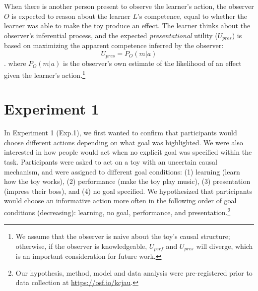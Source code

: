 \documentclass[10pt, letterpaper]{article}
\begin{document}
When there is another person present to observe the learner's action,
the observer \(O\) is expected to reason about the learner \(L\)'s
competence, equal to whether the learner was able to make the toy
produce an effect. The learner thinks about the observer's inferential
process, and the expected \emph{presentational} utility (\(U_{pres}\))
is based on maximizing the apparent competence inferred by the observer:
\[ U_{pres} = P_O(m | a)\]. \noindent
where \(P_O(m | a)\) is the observer's own estimate of the likelihood of
an effect given the learner's action.\footnote{We assume that the
  observer is naive about the toy's causal structure; otherwise, if the
  observer is knowledgeable, \(U_{perf}\) and \(U_{pres}\) will diverge,
  which is an important consideration for future work.}

\section{Experiment 1}\label{experiment-1}

In Experiment 1 (Exp.1), we first wanted to confirm that participants
would choose different actions depending on what goal was highlighted.
We were also interested in how people would act when no explicit goal
was specified within the task. Participants were asked to act on a toy
with an uncertain causal mechanism, and were assigned to different goal
conditions: (1) learning (learn how the toy works), (2) performance
(make the toy play music), (3) presentation (impress their boss), and
(4) no goal specified. We hypothesized that participants would choose an
informative action more often in the following order of goal conditions
(decreasing): learning, no goal, performance, and
presentation.\footnote{Our hypothesis, method, model and data analysis were pre-registered prior to data collection at \url{https://osf.io/kcjau}.}
\end{document}
